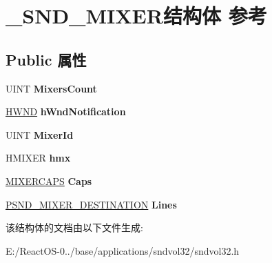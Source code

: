 \hypertarget{struct___s_n_d___m_i_x_e_r}{}\section{\+\_\+\+S\+N\+D\+\_\+\+M\+I\+X\+E\+R结构体 参考}
\label{struct___s_n_d___m_i_x_e_r}
\subsection*{Public 属性}
\begin{DoxyCompactItemize}
\item 
\mbox{\label{struct___s_n_d___m_i_x_e_r_a60e5f03b143d2854dbe5b494cd538b69}} 
U\+I\+NT {\bfseries Mixers\+Count}
\item 
\mbox{\label{struct___s_n_d___m_i_x_e_r_a817d0185037f9423bef076c3de3534b5}} 
\hyperlink{interfacevoid}{H\+W\+ND} {\bfseries h\+Wnd\+Notification}
\item 
\mbox{\label{struct___s_n_d___m_i_x_e_r_a48eb0c0c4b6800112f06f1aa3d36f304}} 
U\+I\+NT {\bfseries Mixer\+Id}
\item 
\mbox{\label{struct___s_n_d___m_i_x_e_r_a7ceb16126ace4b5981b504c7a409e16d}} 
H\+M\+I\+X\+ER {\bfseries hmx}
\item 
\mbox{\label{struct___s_n_d___m_i_x_e_r_aab2fd9c67b73660c2250d9854f810950}} 
\hyperlink{structtag_m_i_x_e_r_c_a_p_s_a}{M\+I\+X\+E\+R\+C\+A\+PS} {\bfseries Caps}
\item 
\mbox{\label{struct___s_n_d___m_i_x_e_r_adac069d83210acb5bae54612ec5b9f30}} 
\hyperlink{struct___s_n_d___m_i_x_e_r___d_e_s_t_i_n_a_t_i_o_n}{P\+S\+N\+D\+\_\+\+M\+I\+X\+E\+R\+\_\+\+D\+E\+S\+T\+I\+N\+A\+T\+I\+ON} {\bfseries Lines}
\end{DoxyCompactItemize}


该结构体的文档由以下文件生成\+:\begin{DoxyCompactItemize}
\item 
E\+:/\+React\+O\+S-\/0../base/applications/sndvol32/sndvol32.\+h\end{DoxyCompactItemize}

